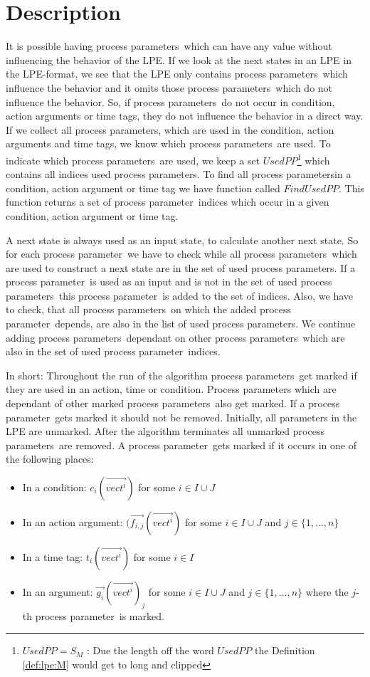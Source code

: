 \documentclass[a4paper,10pt]{article}
\theoremstyle{plain}
\theoremstyle{definition}
\newcommand{\ovr}{\overrightarrow}
\newcommand{\pp}{process parameter}
\newcommand{\pps}{process parameters}
\begin{document}
\section{Description} \label{sec:desc}
It is possible having \pps\ which can have any value without influencing the behavior of the LPE. 
If we look at the next states in an LPE in the LPE-format, we see that the LPE only contains \pps\ which influence the behavior and it omits those \pps\ which do not influence the behavior. So, if \pps\ do not occur in condition, action arguments or time tags, they do not influence the behavior in a direct way. If we collect all \pps , which are used in the condition, action arguments and time tags, we know which \pps\ are used. To indicate which \pps\ are used, we keep a set $UsedPP$\footnote{$UsedPP = S_M$ : Due the length off the word $UsedPP$ the Definition \ref{def:lpe:M} would get to long and clipped} which contains all indices used \pps . To find all \pps in a condition, action argument or time tag we have function called $FindUsedPP$. This function returns a set of  \pp\ indices which occur in a given condition, action argument or time tag. 

A next state is always used as an input state, to calculate another next state. So for each \pp\ we have to check while  all \pps\ which are used to construct a next state are in the set of used \pps . If a \pp\ is used as an input and is not in the set of used \pps\ this \pp\ is added to the set of indices. 
Also, we have to check, that all \pps\ on which the added \pp\ depends, are also in the list of used \pps. We continue adding \pps\ dependant on other \pps\ which are also in the set of used \pp\ indices.

In short: Throughout the run of the algorithm \pps\ get marked if they are used in an action, time or condition. Process parameters which are dependant of other marked \pps\ also get marked. If a \pp\ gets marked it should not be removed. Initially, all parameters in the LPE are unmarked. After the algorithm terminates all unmarked \pps\ are removed. A \pp\ gets marked if it occurs in one of the following places:

\begin{itemize}
\item In a condition: $c_i(\ovr{vect^i})$ for some $i \in I \cup J$
\item In an action argument: %
$(\ovr{f_{i,j}}(\ovr{vect^i})$ for some $i \in I \cup J$ and $j \in \lbrace 1, \ldots , n \rbrace$
\item In a time tag: $t_i(\ovr{vect^i})$ for some $i \in I$
\item In an argument: $\ovr{g_i}(\ovr{vect^i})_j$ for some $i \in I \cup J$ and $j \in \lbrace 1, \ldots , n \rbrace $ where the $j$-th \pp\ is marked.
\end{itemize}
\end{document}
